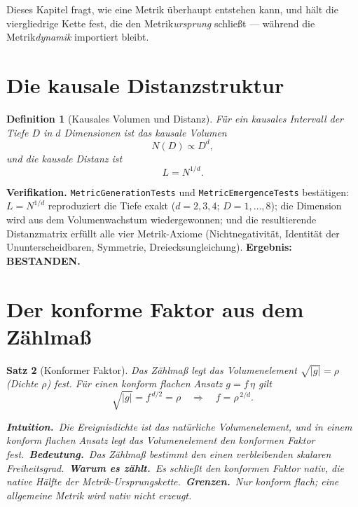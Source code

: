 \documentclass[10pt,twoside,openany]{book}
\newtheorem{theorem}{Satz}[chapter]
\newtheorem{definition}[theorem]{Definition}
\newcommand{\eqnotes}[4]{%
  \par\smallskip\noindent
  \textbf{Intuition.}\ #1\ 
  \textbf{Bedeutung.}\ #2\ 
  \textbf{Warum es zählt.}\ #3\ 
  \textbf{Grenzen.}\ #4\par}
\begin{document}
Dieses Kapitel fragt, wie eine Metrik überhaupt entstehen kann, und hält die viergliedrige
Kette fest, die den Metrik\emph{ursprung} schließt --- während die Metrik\emph{dynamik}
importiert bleibt.

\section{Die kausale Distanzstruktur}

\begin{definition}[Kausales Volumen und Distanz]
Für ein kausales Intervall der Tiefe $D$ in $d$ Dimensionen ist das kausale Volumen
\begin{equation}
N(D) \propto D^d,
\end{equation}
und die kausale Distanz ist
\begin{equation}
L = N^{1/d}.
\end{equation}
\end{definition}

\textbf{Verifikation.} \texttt{MetricGenerationTests} und \texttt{MetricEmergenceTests}
bestätigen: $L=N^{1/d}$ reproduziert die Tiefe exakt ($d=2,3,4$; $D=1,\dots,8$); die
Dimension wird aus dem Volumenwachstum wiedergewonnen; und die resultierende
Distanzmatrix erfüllt alle vier Metrik-Axiome (Nichtnegativität, Identität der
Ununterscheidbaren, Symmetrie, Dreiecksungleichung). \textbf{Ergebnis: BESTANDEN.}

\section{Der konforme Faktor aus dem Zählmaß}

\begin{theorem}[Konformer Faktor]
Das Zählmaß legt das Volumenelement $\sqrt{|g|}=\rho$ (Dichte $\rho$) fest. Für einen
konform flachen Ansatz $g=f\,\eta$ gilt
\begin{equation}
\sqrt{|g|} = f^{\,d/2} = \rho \quad\Longrightarrow\quad f = \rho^{\,2/d}.
\end{equation}

\eqnotes
{Die Ereignisdichte ist das natürliche Volumenelement, und in einem konform flachen
Ansatz legt das Volumenelement den konformen Faktor fest.}
{Das Zählmaß bestimmt den einen verbleibenden skalaren Freiheitsgrad.}
{Es schließt den konformen \emph{Faktor} nativ, die native Hälfte der
Metrik-Ursprungskette.}
{Nur konform flach; eine allgemeine Metrik wird nativ nicht erzeugt.}
\end{theorem}
\end{document}

